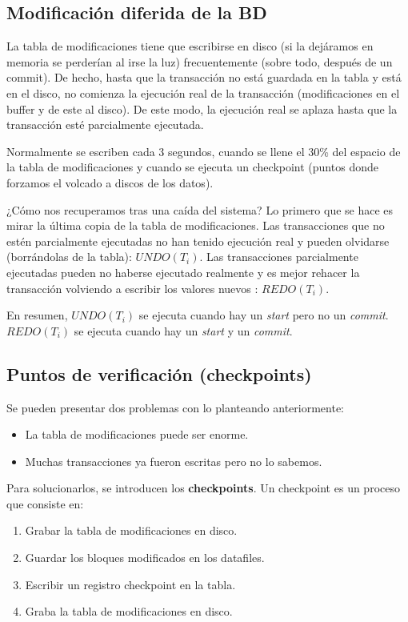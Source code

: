 \subsection{Modificación diferida de la BD}

La tabla de modificaciones tiene que escribirse en disco (si la dejáramos en memoria se perderían al irse la luz) frecuentemente (sobre todo, después de un commit). De hecho, hasta que la transacción no está guardada en la tabla y está en el disco, no comienza la ejecución real de la transacción (modificaciones en el buffer y de este al disco). De este modo, la ejecución real se aplaza hasta que la transacción esté parcialmente ejecutada.

Normalmente se escriben cada 3 segundos, cuando se llene el 30\% del espacio de la tabla de modificaciones y cuando se ejecuta un checkpoint (puntos donde forzamos el volcado a discos de los datos).

¿Cómo nos recuperamos tras una caída del sistema? Lo primero que se hace es mirar la última copia de la tabla de modificaciones. Las transacciones que no estén parcialmente ejecutadas no han tenido ejecución real y pueden olvidarse (borrándolas de la tabla): $UNDO(T_i)$. Las transacciones parcialmente ejecutadas pueden no haberse ejecutado realmente y es mejor rehacer la transacción volviendo a escribir los valores nuevos : $REDO(T_i)$.

En resumen, $UNDO(T_i)$ se ejecuta cuando hay un \textit{start} pero no un \textit{commit}. $REDO(T_i)$ se ejecuta cuando hay un \textit{start} y un \textit{commit}.

\subsection{Puntos de verificación (checkpoints)}

Se pueden presentar dos problemas con lo planteando anteriormente:
\begin{itemize}
\item La tabla de modificaciones puede ser enorme.
\item Muchas transacciones ya fueron escritas pero no lo sabemos.
\end{itemize}

Para solucionarlos, se introducen los \textbf{checkpoints}. Un checkpoint es un proceso que consiste en:
\begin{enumerate}
\item Grabar la tabla de modificaciones en disco.
\item Guardar los bloques modificados en los datafiles.
\item Escribir un registro checkpoint en la tabla.
\item Graba la tabla de modificaciones en disco.
\end{enumerate}


